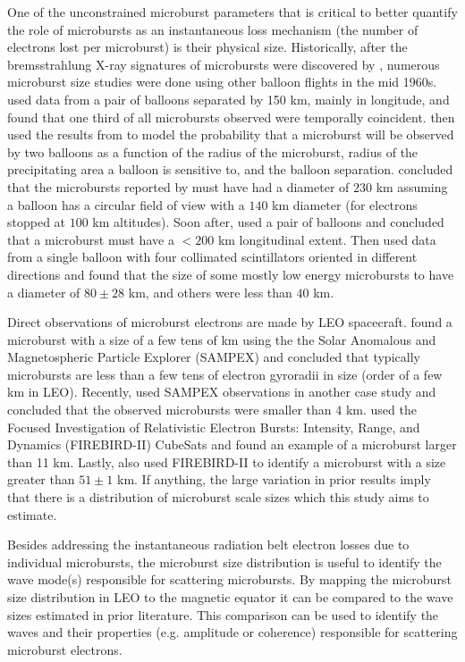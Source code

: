 \documentclass[draft]{agujournal2019}
\begin{document}
One of the unconstrained microburst parameters that is critical to better quantify the role of microbursts as an instantaneous loss mechanism (the number of electrons lost per microburst) is their physical size. Historically, after the bremsstrahlung X-ray signatures of microbursts were discovered by , numerous microburst size studies were done using other balloon flights in the mid 1960s.  used data from a pair of balloons separated by 150 km, mainly in longitude, and found that one third of all microbursts observed were temporally coincident.  then used the results from  to model the probability that a microburst will be observed by two balloons as a function of the radius of the microburst, radius of the precipitating area a balloon is sensitive to, and the balloon separation.  concluded that the microbursts reported by   must have had a diameter of $230$ km assuming a balloon has a circular field of view with a $140$ km diameter (for electrons stopped at $100$ km altitudes). Soon after,  used a pair of balloons and concluded that a microburst must have a $<200$ km longitudinal extent. Then  used data from a single balloon with four collimated scintillators oriented in different directions and found that the size of some mostly low energy microbursts to have a diameter of $80 \pm 28$ km, and others were less than $40$ km. 

Direct observations of microburst electrons are made by LEO spacecraft.  found a microburst with a size of a few tens of km using the the Solar Anomalous and Magnetospheric Particle Explorer (SAMPEX) and concluded that typically microbursts are less than a few tens of electron gyroradii in size (order of a few km in LEO). Recently,  used SAMPEX observations in another case study and concluded that the observed microbursts were smaller than $4$ km.  used the Focused Investigation of Relativistic Electron Bursts: Intensity, Range, and Dynamics (FIREBIRD-II) CubeSats and found an example of a microburst larger than 11 km. Lastly,  also used FIREBIRD-II to identify a microburst with a size greater than $ 51 \pm 1$ km. If anything, the large variation in prior results imply that there is a distribution of microburst scale sizes which this study aims to estimate.

Besides addressing the instantaneous radiation belt electron losses due to individual microbursts, the microburst size distribution is useful to identify the wave mode(s) responsible for scattering microbursts. By mapping the microburst size distribution in LEO to the magnetic equator it can be compared to the wave sizes estimated in prior literature. This comparison can be used to identify the waves and their properties (e.g. amplitude or coherence) responsible for scattering microburst electrons.
\end{document}
